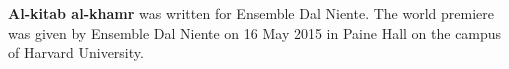 \textbf{Al-kitab al-khamr} was written for Ensemble Dal Niente. The world
premiere was given by Ensemble Dal Niente on 16 May 2015 in Paine Hall on the
campus of Harvard University.
